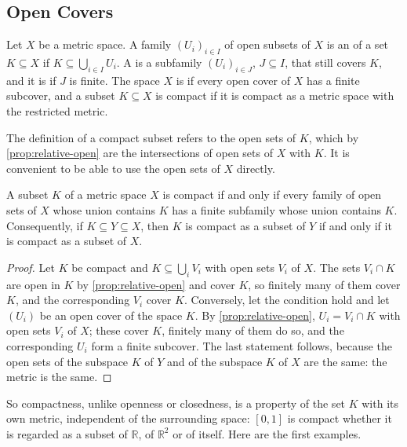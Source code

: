 \subsection{Open Covers}

\begin{definition}
\label{def:compact}
Let $X$ be a metric space. A family $(U_i)_{i\in I}$ of open subsets of $X$ is an  of a set $K\subseteq X$ if $K\subseteq\bigcup_{i\in I}U_i$. A  is a subfamily $(U_i)_{i\in J}$, $J\subseteq I$, that still covers $K$, and it is  if $J$ is finite. The space $X$ is  if every open cover of $X$ has a finite subcover, and a subset $K\subseteq X$ is compact if it is compact as a metric space with the restricted metric.
\end{definition}

The definition of a compact subset refers to the open sets of $K$, which by \cref{prop:relative-open} are the intersections of open sets of $X$ with $K$. It is convenient to be able to use the open sets of $X$ directly.

\begin{proposition}
\label{prop:compact-subset}
A subset $K$ of a metric space $X$ is compact if and only if every family of open sets of $X$ whose union contains $K$ has a finite subfamily whose union contains $K$. Consequently, if $K\subseteq Y\subseteq X$, then $K$ is compact as a subset of $Y$ if and only if it is compact as a subset of $X$.
\end{proposition}

\begin{proof}
Let $K$ be compact and $K\subseteq\bigcup_iV_i$ with open sets $V_i$ of $X$. The sets $V_i\cap K$ are open in $K$ by \cref{prop:relative-open} and cover $K$, so finitely many of them cover $K$, and the corresponding $V_i$ cover $K$. Conversely, let the condition hold and let $(U_i)$ be an open cover of the space $K$. By \cref{prop:relative-open}, $U_i=V_i\cap K$ with open sets $V_i$ of $X$; these cover $K$, finitely many of them do so, and the corresponding $U_i$ form a finite subcover. The last statement follows, because the open sets of the subspace $K$ of $Y$ and of the subspace $K$ of $X$ are the same: the metric is the same.
\end{proof}

So compactness, unlike openness or closedness, is a property of the set $K$ with its own metric, independent of the surrounding space: $[0,1]$ is compact whether it is regarded as a subset of $\mathbb R$, of $\mathbb R^2$ or of itself. Here are the first examples.

